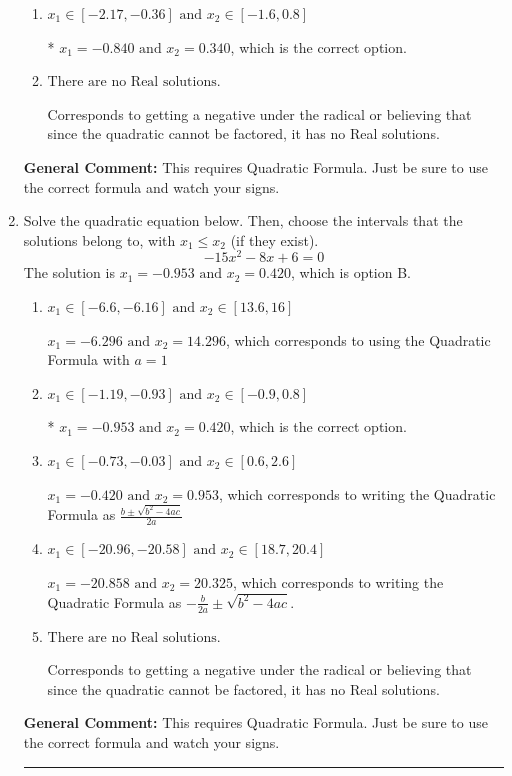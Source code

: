\documentclass{extbook}[14pt]
\newcommand{\litem}[1]{\item #1

\rule{\textwidth}{0.4pt}}
\begin{document}
\begin{enumerate}
{\begin{enumerate}[label=\Alph*.]
 $x_1 = -11.761 \text{ and } x_2 = 4.761$, which corresponds to using the Quadratic Formula with $a=1$
\item \( x_1 \in [-2.17, -0.36] \text{ and } x_2 \in [-1.6, 0.8] \)

* $x_1 = -0.840 \text{ and } x_2 = 0.340$, which is the correct option.
\item \( \text{There are no Real solutions.} \)

Corresponds to getting a negative under the radical or believing that since the quadratic cannot be factored, it has no Real solutions.
\end{enumerate}

\textbf{General Comment:} This requires Quadratic Formula. Just be sure to use the correct formula and watch your signs.
}
\litem{
Solve the quadratic equation below. Then, choose the intervals that the solutions belong to, with $x_1 \leq x_2$ (if they exist).
\[ -15x^{2} -8 x + 6 = 0 \]The solution is \( x_1 = -0.953 \text{ and } x_2 = 0.420 \), which is option B.\begin{enumerate}[label=\Alph*.]
\item \( x_1 \in [-6.6, -6.16] \text{ and } x_2 \in [13.6, 16] \)

 $x_1 = -6.296 \text{ and } x_2 = 14.296$, which corresponds to using the Quadratic Formula with $a=1$
\item \( x_1 \in [-1.19, -0.93] \text{ and } x_2 \in [-0.9, 0.8] \)

* $x_1 = -0.953 \text{ and } x_2 = 0.420$, which is the correct option.
\item \( x_1 \in [-0.73, -0.03] \text{ and } x_2 \in [0.6, 2.6] \)

 $x_1 = -0.420 \text{ and } x_2 = 0.953$, which corresponds to writing the Quadratic Formula as $\frac{b \pm \sqrt{b^2 - 4ac}}{2a}$
\item \( x_1 \in [-20.96, -20.58] \text{ and } x_2 \in [18.7, 20.4] \)

 $x_1 = -20.858 \text{ and } x_2 = 20.325$, which corresponds to writing the Quadratic Formula as $-\frac{b}{2a} \pm \sqrt{b^2 - 4ac}$.
\item \( \text{There are no Real solutions.} \)

Corresponds to getting a negative under the radical or believing that since the quadratic cannot be factored, it has no Real solutions.
\end{enumerate}

\textbf{General Comment:} This requires Quadratic Formula. Just be sure to use the correct formula and watch your signs.
}
\end{enumerate}
\end{document}

